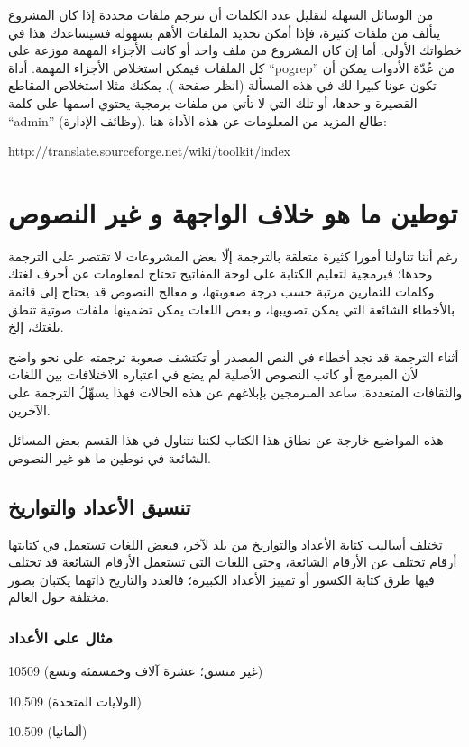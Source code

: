 من الوسائل السهلة لتقليل عدد الكلمات أن تترجم ملفات محددة إذا كان
المشروع يتألف من ملفات كثيرة، فإذا أمكن تحديد الملفات الأهم بسهولة
فسيساعدك هذا في خطواتك الأولى. أما إن كان المشروع من ملف واحد أو كانت
الأجزاء المهمة موزعة على كل الملفات فيمكن استخلاص الأجزاء المهمة. أداة
“pogrep” من عُدّة الأدوات يمكن أن تكون عونا كبيرا لك في هذه المسألة
(انظر صفحة \at[ref:20165030]). يمكنك مثلا استخلاص المقاطع
القصيرة و حدها، أو تلك التي لا تأتي من ملفات برمجية يحتوي اسمها على
كلمة “admin” (وظائف الإدارة). طالع المزيد من المعلومات عن هذه الأداة
هنا:

http://translate.sourceforge.net/wiki/toolkit/index

\section{توطين ما هو خلاف الواجهة و غير النصوص}
رغم أننا تناولنا أمورا كثيرة متعلقة بالترجمة إلّا بعض المشروعات لا تقتصر
على الترجمة وحدها؛ فبرمجية لتعليم الكتابة على لوحة المفاتيح تحتاج
لمعلومات عن أحرف لغتك وكلمات للتمارين مرتبة حسب درجة صعوبتها، و معالج
النصوص قد يحتاج إلى قائمة بالأخطاء الشائعة التي يمكن تصويبها، و بعض
اللغات يمكن تضمينها ملفات صوتية تنطق بلغتك، إلخ.

أثناء الترجمة قد تجد أخطاء في النص المصدر أو تكتشف صعوبة ترجمته على نحو
واضح لأن المبرمج أو كاتب النصوص الأصلية لم يضع في اعتباره الاختلافات
بين اللغات والثقافات المتعددة. ساعد المبرمجين بإبلاغهم عن هذه الحالات
فهذا يسهِّلُ الترجمة على الآخرين.

هذه المواضيع خارجة عن نطاق هذا الكتاب لكننا نتناول في هذا القسم بعض
المسائل الشائعة في توطين ما هو غير النصوص.

\subsection[ref:30596701]{تنسيق الأعداد والتواريخ}
تختلف أساليب كتابة الأعداد
والتواريخ من بلد لآخر، فبعض اللغات تستعمل في كتابتها أرقام تختلف عن
الأرقام الشائعة، وحتى اللغات التي تستعمل الأرقام الشائعة قد تختلف فيها
طرق كتابة الكسور أو تمييز الأعداد الكبيرة؛ فالعدد والتاريخ ذاتهما
يكتبان بصور مختلفة حول العالم.

\subsubsection{مثال على الأعداد}
10509 (غير منسق؛ عشرة آلاف وخمسمئة وتسع)

10,509 (الولايات المتحدة)

10.509 (ألمانيا)

